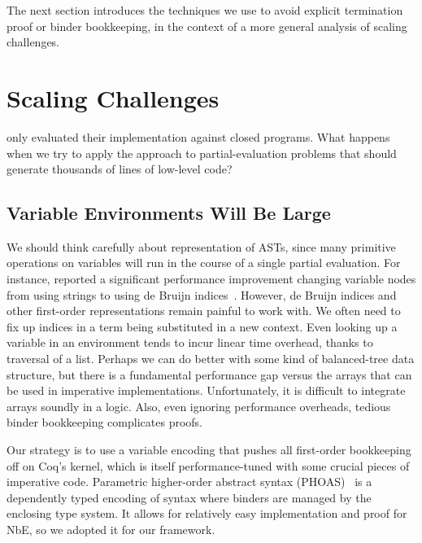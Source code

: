 The next section introduces the techniques we use to avoid explicit termination proof or binder bookkeeping, in the context of a more general analysis of scaling challenges.


\section{Scaling Challenges} \label{sec:scaling}

\textcite{Aehlig} only evaluated their implementation against closed programs.
What happens when we try to apply the approach to partial-evaluation problems that should generate thousands of lines of low-level code?

\subsection{Variable Environments Will Be Large} \label{sec:PHOAS}
We should think carefully about representation of ASTs, since many primitive operations on variables will run in the course of a single partial evaluation.
For instance, \textcite{Aehlig} reported a significant performance improvement changing variable nodes from using strings to using de Bruijn indices~\cite{debruijn1972}.
However, de Bruijn indices and other first-order representations remain painful to work with.
We often need to fix up indices in a term being substituted in a new context.
Even looking up a variable in an environment tends to incur linear time overhead, thanks to traversal of a list.
Perhaps we can do better with some kind of balanced-tree data structure, but there is a fundamental performance gap versus the arrays that can be used in imperative implementations.
Unfortunately, it is difficult to integrate arrays soundly in a logic.
Also, even ignoring performance overheads, tedious binder bookkeeping complicates proofs.

Our strategy is to use a variable encoding that pushes all first-order bookkeeping off on Coq's kernel, which is itself performance-tuned with some crucial pieces of imperative code.
Parametric higher-order abstract syntax (PHOAS)~\cite{PhoasICFP08} is a dependently typed encoding of syntax where binders are managed by the enclosing type system.
It allows for relatively easy implementation and proof for NbE, so we adopted it for our framework.

